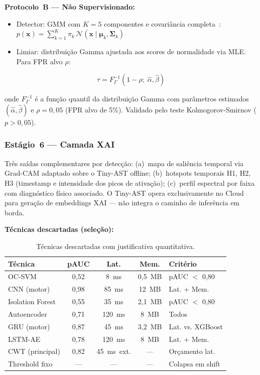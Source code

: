 \textbf{Protocolo~B --- Não Supervisionado:}
\begin{itemize}
    \item Detector: GMM com $K{=}5$ componentes e covariância completa~\cite{Khamaisi2025}:
          $p(\mathbf{x}) = \sum_{k=1}^{K} \pi_k\, \mathcal{N}(\mathbf{x} \mid \boldsymbol{\mu}_k, \boldsymbol{\Sigma}_k)$
    \item Limiar: distribuição Gamma ajustada aos scores de normalidade via MLE. Para FPR alvo $\rho$:
\end{itemize}

\begin{equation}
\tau = F_\Gamma^{-1}(1 - \rho;\; \hat{\alpha}, \hat{\beta})
\label{eq:gamma_threshold}
\end{equation}

\noindent onde $F_\Gamma^{-1}$ é a função quantil da distribuição Gamma com parâmetros estimados
$(\hat{\alpha}, \hat{\beta})$ e $\rho{=}0{,}05$ (FPR alvo de 5\%). Validado pelo teste
Kolmogorov-Smirnov ($p{>}0{,}05$).

\subsubsection{Estágio~6 --- Camada XAI}

Três saídas complementares por detecção: (a)~mapa de saliência temporal via Grad-CAM adaptado sobre o
Tiny-AST offline; (b)~hotspots temporais H1, H2, H3 (timestamp e intensidade dos picos de ativação);
(c)~perfil espectral por faixa com diagnóstico físico associado. O Tiny-AST opera exclusivamente no
Cloud para geração de embeddings XAI --- não integra o caminho de inferência em borda.

\textbf{Técnicas descartadas (seleção):}

\begin{table}[H]
\centering
\footnotesize
\begin{tabularx}{\columnwidth}{@{} l c c c X @{}}
\toprule
\textbf{Técnica} & \textbf{pAUC} & \textbf{Lat.} & \textbf{Mem.} & \textbf{Critério} \\ \midrule
OC-SVM & 0,52 & 8~ms & 0,5~MB & pAUC $<$ 0,80 \\
CNN (motor) & 0,98 & 85~ms & 12~MB & Lat. + Mem. \\
Isolation Forest & 0,55 & 35~ms & 2,1~MB & pAUC $<$ 0,80 \\
Autoencoder & 0,71 & 120~ms & 8~MB & Todos \\
GRU (motor) & 0,87 & 45~ms & 3,2~MB & Lat. vs. XGBoost \\
LSTM-AE & 0,78 & 120~ms & 8~MB & Lat. + Mem. \\
CWT (principal) & 0,82 & 45~ms~ext. & --- & Orçamento lat. \\
Threshold fixo & --- & --- & --- & Colapsa em shift \\
\bottomrule
\end{tabularx}
\caption{Técnicas descartadas com justificativa quantitativa.}
\label{tab:descartadas}
\end{table}

\color{black}
